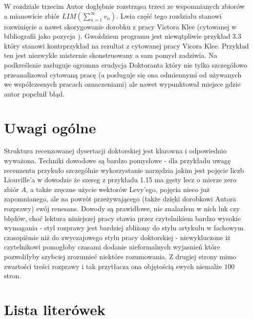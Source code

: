 \documentclass[12pt]{article}
\begin{document}
  W rozdziale trzecim Autor dogłębnie rozstrząsa 
trzeci ze wspomnianych zbiorów a mianowicie
zbiór $LIM(\sum_{n=1}^\infty v_n)$. Lwia część 
tego rozdziału stanowi rozwinięcie a nawet
skorygowanie dorobku z pracy Victora Klee
(cytowanej w bibliografii jako pozycja \big[28\big]).
Gwoździem programu jest niewątpliwie przykład
3.3 który stanowi kontrprzykład na rezultat
z cytowanej pracy Vicora Klee. Przykład ten
jest niezwykle misternie skonstruowany a
sam pomysł zadziwia. Na podkreślenie zasługuje 
ogromna erudycja Doktoranta który nie tylko
szczegółowo przeanalizował cytowaną
pracę (a posługuje się ona odmiennymi od 
używanych we współczesnych pracach oznaczeniami)
ale nawet wypunktował miejsce gdzie autor 
popełnił błąd.

\section{Uwagi ogólne}

  Struktura recenzowanej dysertacji doktorskiej jest
klarowna i odpowiednio wyważona. Techniki dowodowe 
są bardzo pomysłowe - dla przykładu uwagę recenzenta 
przykuło szczególnie wykorzystanie narzędzia jakim jest
pojęcie liczb Liouville'a w dowodzie że szereg z przykładu
1.15 ma gęsty lecz o mierze zero zbiór $A$, a także
zręczne użycie wektorów Levy'ego, pojęcia nieco już 
zapomnianego, ale na powrót 
przeżywającego (także dzięki dorobkowi Autora rozprawy) 
swój renesans. 
  Dowody są prawidłowe, nie znalazłem w nich luk czy 
błędów, choć lektura niniejszej pracy stawia przez
czytelnikiem bardzo wysokie wymagania - styl rozprawy
jest bardziej zbliżony do stylu artykułu w fachowym czasopiśmie
niż do zwyczajowego stylu pracy doktorskiej - niewykluczone
iż czytelnikowi pomogłoby czasami dodanie nieformalnych
wyjasnień które pozwoliłyby szybciej zrozumieć niektóre 
rozumowania. Z drugiej strony mimo zwartości treści 
rozprawy i tak przytłacza ona objętością swych niemalże
$100$ stron.


\section{Lista literówek}
\end{document}
